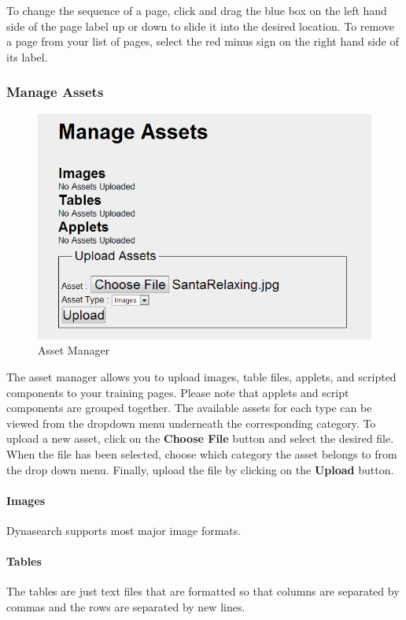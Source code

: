 \documentclass[article]{ij4uq}              %
\begin{document}
To change the sequence of a page, click and drag the blue box on the left hand side of the page label up or down to slide it into the desired location. To remove a page from your list of pages, select the red minus sign on the right hand side of its label.

\subsubsection {Manage Assets}

\begin{figure}[h!]
 \centering
 \includegraphics[width=5.0in]{figures/manage_assets.png}
 \caption{Asset Manager}
 \label{fig:manageAsset}
\end{figure}
\FloatBarrier

The asset manager allows you to upload images, table files, applets, and scripted components to your training pages.  Please note that applets and script components are grouped together.  The available assets for each type can be viewed from the dropdown menu underneath the corresponding category.  To upload a new asset, click on the \textbf{Choose File} button and select the desired file.  When the file has been selected, choose which category the asset belongs to from the drop down menu.  Finally, upload the file by clicking on the \textbf{Upload} button.

\paragraph{Images}
Dynasearch supports most major image formats.

\paragraph{Tables}
The tables are just text files that are formatted so that columns are separated by commas and the rows are separated by new lines.
\end{document}
